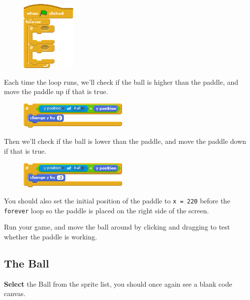 		\begin{figure}[h!]
			\centering
			\includegraphics[height=130px]{McrRaspJam/018_ScratchGames/code/2_loop}
			\label{fig:opponentloop}
		\end{figure}
	
		Each time the loop runs, we'll check if the ball is higher than the paddle, and move the paddle up if that is true.
		
		\begin{figure}[h!]
			\centering
			\includegraphics[height=49px]{McrRaspJam/018_ScratchGames/code/2_if1}
			\label{fig:opponentif1}
		\end{figure}
		
		Then we'll check if the ball is lower than the paddle, and move the paddle down if that is true.
		
		\begin{figure}[h!]
			\centering
			\includegraphics[height=49px]{McrRaspJam/018_ScratchGames/code/2_if2}
			\label{fig:opponentif2}
		\end{figure}
	
		You should also set the initial position of the paddle to \texttt{x = 220} before the \texttt{forever} loop so the paddle is placed on the right side of the screen.
		
		Run your game, and move the ball around by clicking and dragging to test whether the paddle is working.
		
	\subsection{The Ball}
	
		\textbf{Select} the Ball from the sprite list, you should once again see a blank code canvas.
		
